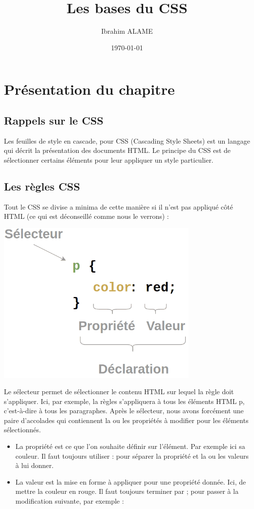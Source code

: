 \documentclass[a4paper]{article}
\title{Les bases du CSS}
\author{Ibrahim ALAME}
\date{\today}
\begin{document}
 
\maketitle

\section{Présentation du chapitre}
\subsection{Rappels sur le {\color{monOrange}CSS}}
Les feuilles de style en cascade, pour {\color{monOrange}CSS (Cascading Style Sheets)} est un langage qui décrit la présentation des documents {\color{monOrange}HTML}. Le principe du {\color{monOrange}CSS} est de sélectionner certains éléments pour leur appliquer un style particulier.

\subsection{Les règles {\color{monOrange}CSS}}
Tout le {\color{monOrange}CSS} se divise a minima de cette manière si il n'est pas appliqué côté {\color{monOrange}HTML} (ce qui est déconseillé comme nous le verrons) :

\begin{center}
\includegraphics[width=10cm]{images/image07.png}
\end{center}

Le sélecteur permet de sélectionner le contenu {\color{monOrange}HTML} sur lequel la règle doit s'appliquer. Ici, par exemple, la règles s'appliquera à tous les éléments {\color{monOrange}HTML} p, c'est-à-dire à tous les paragraphes. Après le sélecteur, nous avons forcément une paire d'accolades qui contiennent la ou les propriétés à modifier pour les éléments sélectionnés. 
\begin{itemize}
\item La propriété est ce que l'on souhaite définir sur l'élément. Par exemple ici sa couleur. Il faut toujours utiliser : pour séparer la propriété et la ou les valeurs à lui donner.

\item La valeur est la mise en forme à appliquer pour une propriété donnée. Ici, de mettre la couleur en rouge. Il faut toujours terminer par ; pour passer à la modification suivante, par exemple :
\end{itemize}
\end{document}
